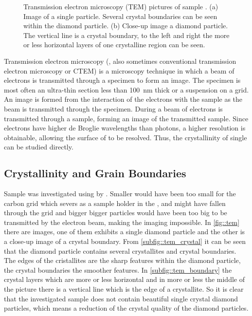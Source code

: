 \begin{figure}[htp]
\begin{subfigure}[t]{ 0.49\linewidth}
					\label{subfig::tem_boundary}
				\end{subfigure}
				\caption[\TEM imaging of a single \nd]{Transmission electron microscopy (TEM) pictures of sample \insituH. (a) Image of a single \nd particle. Several crystal boundaries can be seen within the diamond particle. (b) Close-up image a diamond particle. The vertical line is a crystal boundary, to the left and right the more or less horizontal layers of one crystalline region can be seen.}
				\label{fig::tem}
			\end{figure}

			Transmission electron microscopy (\TEM, also sometimes conventional transmission electron microscopy or CTEM) is a microscopy technique in which a beam of electrons is transmitted through a specimen to form an image. The specimen is most often an ultra-thin section less than \SI{100}{\nm} thick or a suspension on a grid. An image is formed from the interaction of the electrons with the sample as the beam is transmitted through the specimen.
			During \tem a beam of electrons is transmitted through a sample, forming an image of the transmitted sample.
			Since electrons have higher de Broglie wavelengths than photons, a higher resolution is obtainable, allowing the surface of \nds to be resolved. Thus, the crystallinity of single \nds can be studied directly.

			\subsection{Crystallinity and Grain Boundaries}\label{subsection::tem_crystal}

				Sample \insituH was investigated using \TEM by \schmauch.
				Smaller \nds would have been too small for the carbon grid which severs as a sample holder in the \TEM, and might have fallen through the grid and bigger bigger particles would have been too big to be transmitted by the electron beam, making the imaging impossible.
				In \autoref{fig::tem} there are \TEM images, one of them exhibits a single diamond particle and the other is a close-up image of a crystal boundary.
				From \autoref{subfig::tem_crystal} it can be seen that the diamond particle contains several crystallites and crystal boundaries.
				The edges of the cristallites are the sharp features within the diamond particle, the crystal boundaries the smoother features.
				In \autoref{subfig::tem_boundary} the crystal layers which are more or less horizontal and in more or less the middle of the picture there is a vertical line which is the edge of a crystallite.
				So it is clear that the investigated sample does not contain beautiful single crystal diamond particles, which means a reduction of the crystal quality of the diamond particles.
